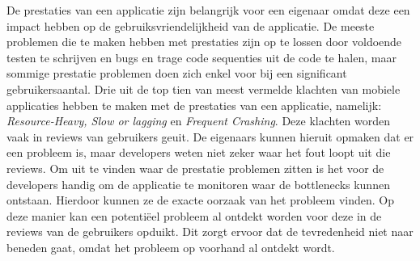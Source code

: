 De prestaties van een applicatie zijn belangrijk voor een eigenaar omdat deze een impact hebben op de gebruiksvriendelijkheid van de applicatie. De meeste problemen die te maken hebben met prestaties zijn op te lossen door voldoende testen te schrijven en bugs en trage code sequenties uit de code te halen, maar sommige prestatie problemen doen zich enkel voor bij een significant gebruikersaantal. Drie uit de top tien van meest vermelde klachten van mobiele applicaties hebben te maken met de prestaties van een applicatie, namelijk: \textit{Resource-Heavy, Slow or lagging} en \textit{Frequent Crashing}. Deze klachten worden vaak in reviews van gebruikers geuit. De eigenaars kunnen hieruit opmaken dat er een probleem is, maar developers weten niet zeker waar het fout loopt uit die reviews. Om uit te vinden waar de prestatie problemen zitten is het voor de developers handig om de applicatie te monitoren waar de bottlenecks kunnen ontstaan. Hierdoor kunnen ze de exacte oorzaak van het probleem vinden. Op deze manier kan een potenti\"eel probleem al ontdekt worden voor deze in de reviews van de gebruikers opduikt. Dit zorgt ervoor dat de tevredenheid niet naar beneden gaat, omdat het probleem op voorhand al ontdekt wordt. \\


